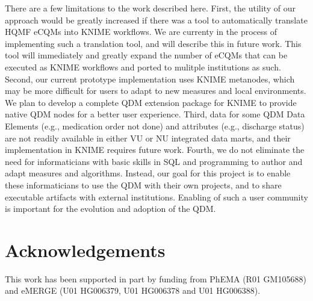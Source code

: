 \documentclass{article}
\begin{document}
There are a few limitations to the work described here. First, the utility of our approach would be greatly increased if there was a tool to automatically translate HQMF eCQMs into KNIME workflows. We are currenty in the process of implementing such a translation tool, and will describe this in future work. This tool will immediately and greatly expand the number of eCQMs that can be executed as KNIME workflows and ported to mulitple institutions as such. Second, our current prototype implementation uses KNIME metanodes, which may be more difficult for users to adapt to new measures and local environments. We plan to develop a complete QDM extension package for KNIME to provide native QDM nodes for a better user experience. Third, data for some QDM Data Elements (e.g., medication order not done) and attributes (e.g., discharge status) are not readily available in either VU or NU integrated data marts, and their implementation in KNIME requires future work. Fourth, we do not eliminate the need for informaticians with basic skills in SQL and programming to author and adapt measures and algorithms. Instead, our goal for this project is to enable these informaticians to use the QDM with their own projects, and to share executable artifacts with external institutions. Enabling of such a user community is important for the evolution and adoption of the QDM.

\section{Acknowledgements}

This work has been supported in part by funding from PhEMA (R01 GM105688) and eMERGE (U01 HG006379, U01 HG006378 and U01 HG006388).

\centering


\end{document}
